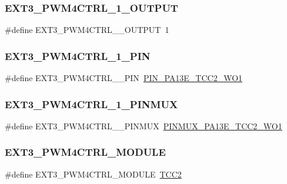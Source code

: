 \subsubsection{\texorpdfstring{EXT3\_PWM4CTRL\_1\_OUTPUT}{EXT3\_PWM4CTRL\_1\_OUTPUT}}
{\footnotesize\ttfamily \#define E\+X\+T3\+\_\+\+P\+W\+M4\+C\+T\+R\+L\+\_\+\_\+\+O\+U\+T\+P\+UT~1}

\mbox{\label{group__samd21__xplained__pro__features__group_ga208afbd0b443467e32bbe296baa1523a}} 
\subsubsection{\texorpdfstring{EXT3\_PWM4CTRL\_1\_PIN}{EXT3\_PWM4CTRL\_1\_PIN}}
{\footnotesize\ttfamily \#define E\+X\+T3\+\_\+\+P\+W\+M4\+C\+T\+R\+L\+\_\+\_\+\+P\+IN~\mbox{\hyperlink{pio_2samd21j18a_8h_a059ef09cbbf65788fb66a4c81ae8bf72}{P\+I\+N\+\_\+\+P\+A13\+E\+\_\+\+T\+C\+C2\+\_\+\+W\+O1}}}

\mbox{\label{group__samd21__xplained__pro__features__group_gacc23e562032f950f8b82707fe176edd1}} 
\subsubsection{\texorpdfstring{EXT3\_PWM4CTRL\_1\_PINMUX}{EXT3\_PWM4CTRL\_1\_PINMUX}}
{\footnotesize\ttfamily \#define E\+X\+T3\+\_\+\+P\+W\+M4\+C\+T\+R\+L\+\_\+\_\+\+P\+I\+N\+M\+UX~\mbox{\hyperlink{pio_2samd21j18a_8h_a1832f1623f7a061c8fda01b6ce84b9cf}{P\+I\+N\+M\+U\+X\+\_\+\+P\+A13\+E\+\_\+\+T\+C\+C2\+\_\+\+W\+O1}}}

\mbox{\label{group__samd21__xplained__pro__features__group_gab417c3517b117a905bbd28e331160b48}} 
\subsubsection{\texorpdfstring{EXT3\_PWM4CTRL\_MODULE}{EXT3\_PWM4CTRL\_MODULE}}
{\footnotesize\ttfamily \#define E\+X\+T3\+\_\+\+P\+W\+M4\+C\+T\+R\+L\+\_\+\+M\+O\+D\+U\+LE~\mbox{\hyperlink{group___s_a_m_d21_j18_a__base_ga121a04059fe14ada844fa8b342359d6e}{T\+C\+C2}}}

